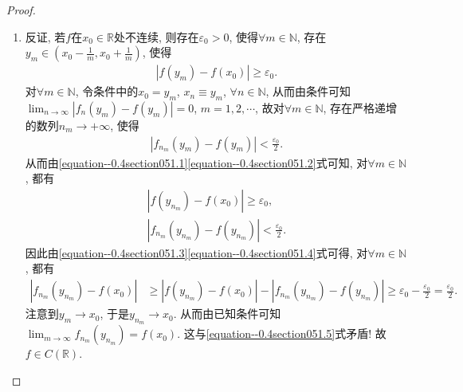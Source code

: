 \documentclass[../../main.tex]{subfiles}
\begin{document}
\begin{proof}
\begin{enumerate}
\item 反证, 若\(f\)在\(x_0\in \mathbb{R}\)处不连续, 则存在\(\varepsilon_0 > 0\), 使得\(\forall m\in \mathbb{N}\), 存在\(y_m\in (x_0 - \frac{1}{m}, x_0 + \frac{1}{m})\), 使得
\begin{align}
|f(y_m) - f(x_0)| \geqslant \varepsilon_0. \label{equation--0.4section051.1}
\end{align}
对\(\forall m\in \mathbb{N}\), 令条件中的\(x_0 = y_m\), \(x_n\equiv y_m\), \(\forall n\in \mathbb{N}\), 从而由条件可知\(\lim_{n\rightarrow \infty}|f_n(y_m) - f(y_m)| = 0\), \(m = 1,2,\cdots\),
故对\(\forall m\in \mathbb{N}\), 存在严格递增的数列\(n_m\rightarrow +\infty\), 使得
\begin{align}
|f_{n_m}(y_m) - f(y_m)| < \frac{\varepsilon_0}{2}. \label{equation--0.4section051.2}
\end{align}
从而由\eqref{equation--0.4section051.1}\eqref{equation--0.4section051.2}式可知, 对\(\forall m\in \mathbb{N}\), 都有
\begin{gather}
|f(y_{n_m}) - f(x_0)| \geqslant \varepsilon_0, \label{equation--0.4section051.3}\\
|f_{n_m}(y_{n_m}) - f(y_{n_m})| < \frac{\varepsilon_0}{2}. \label{equation--0.4section051.4}
\end{gather}
因此由\eqref{equation--0.4section051.3}\eqref{equation--0.4section051.4}式可得, 对\(\forall m\in \mathbb{N}\), 都有
\begin{align}
|f_{n_m}(y_{n_m}) - f(x_0)| &\geqslant |f(y_{n_m}) - f(x_0)| - |f_{n_m}(y_{n_m}) - f(y_{n_m})| \geqslant \varepsilon_0 - \frac{\varepsilon_0}{2} = \frac{\varepsilon_0}{2}. \label{equation--0.4section051.5}
\end{align}
注意到\(y_m\rightarrow x_0\), 于是\(y_{n_m}\rightarrow x_0\). 从而由已知条件可知\(\lim_{m\rightarrow \infty}f_{n_m}(y_{n_m}) = f(x_0)\). 这与\eqref{equation--0.4section051.5}式矛盾! 故\(f\in C(\mathbb{R})\). 
\end{enumerate}

\end{proof}
\end{document}
